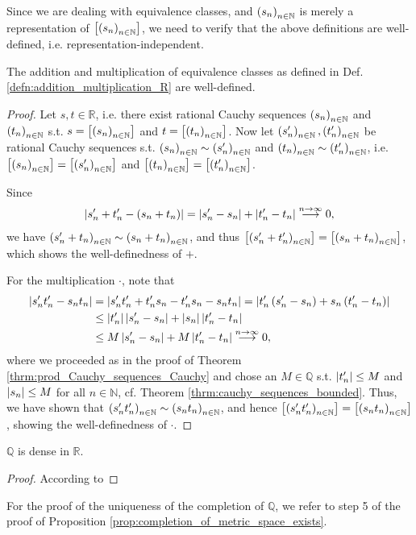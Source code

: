 \begin{remark}
	Since we are dealing with equivalence classes, and $\seq[s_n]$ is merely a representation of $\left[\seq[s_n]\right]$, we need to verify that the above definitions are well-defined, i.e. representation-independent.
\end{remark}

\begin{theorem}
	The addition and multiplication of equivalence classes as defined in Def. \ref{defn:addition_multiplication_R} are well-defined.
\end{theorem}

\begin{proof}
	Let $s, t\in\mathbb R$, i.e. there exist rational Cauchy sequences $\seq[s_n]$ and $\seq[t_n]$ s.t. $s = \left[\seq[s_n]\right]$ and $t = \left[\seq[t_n]\right]$. Now let $\seq[s_n'], \seq[t_n']$ be rational Cauchy sequences s.t. $\seq[s_n]\sim \seq[s_n']$ and $\seq[t_n]\sim \seq[t_n']$, i.e. $\left[\seq[s_n]\right] = \left[\seq[s_n']\right]$ and  $\left[\seq[t_n]\right] = \left[\seq[t_n']\right]$. 
	
	Since 
	\begin{align*}
		\abs{s_n' + t_n' - (s_n + t_n)} = \abs{s_n' - s_n} + \abs{t_n' - t_n} \overset{n\to\infty}{\longrightarrow} 0,
	\end{align*}
	we have $\seq[s_n' + t_n] \sim \seq[s_n + t_n]$, and thus $\left[\seq[s_n' + t_n']\right] = \left[\seq[s_n + t_n]\right]$, which shows the well-definedness of $+$.
	
	For the multiplication $\cdot$, note that
	\begin{align*}
		\abs{s_n't_n' - s_nt_n} &= \abs{s_n't_n' + t_n's_n - t_n's_n - s_nt_n} = \abs{t_n'\left(s_n' - s_n\right) + s_n\left(t_n' - t_n\right)}
		\\ &\leq \abs{t_n'}\abs{s_n'-s_n} + \abs{s_n}\abs{t_n' - t_n}
		\\ &\leq M\abs{s_n'-s_n} + M\abs{t_n' - t_n} \overset{n\to\infty}{\longrightarrow} 0,
	\end{align*}
	where we proceeded as in the proof of Theorem \ref{thrm:prod_Cauchy_sequences_Cauchy} and chose an $M\in\mathbb Q$ s.t. $\abs{t_n'}\leq M$ and $\abs{s_n}\leq M$ for all $n\in\mathbb N$, cf. Theorem \ref{thrm:cauchy_sequences_bounded}. Thus, we have shown that $\seq[s_n't_n'] \sim \seq[s_nt_n]$, and hence $\left[\seq[s_n't_n']\right] = \left[\seq[s_nt_n]\right]$, showing the well-definedness of $\cdot$.
\end{proof}

\begin{theorem}
	$\mathbb Q$ is dense in $\mathbb R$.
\end{theorem}

\begin{proof}
	According to 
\end{proof}


\begin{remark}
	For the proof of the uniqueness of the completion of $\mathbb Q$, we refer to step 5 of the proof of Proposition \ref{prop:completion_of_metric_space_exists}.
\end{remark}